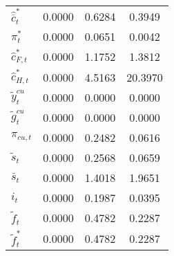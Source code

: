 \begin{center}
\begin{longtable}{lccc}
${\hat {\bar c}_t^*}  $	 & 	       0.0000	 & 	       0.6284	 & 	       0.3949 \\ 
${\pi_t^*}            $	 & 	       0.0000	 & 	       0.0651	 & 	       0.0042 \\ 
${\hat c_{F,t}^*}     $	 & 	       0.0000	 & 	       1.1752	 & 	       1.3812 \\ 
${\hat c_{H,t}^*}     $	 & 	       0.0000	 & 	       4.5163	 & 	      20.3970 \\ 
${\tilde y_t^{cu}}    $	 & 	       0.0000	 & 	       0.0000	 & 	       0.0000 \\ 
${\tilde g_t^{cu}}    $	 & 	       0.0000	 & 	       0.0000	 & 	       0.0000 \\ 
${\pi_{cu,t}}         $	 & 	       0.0000	 & 	       0.2482	 & 	       0.0616 \\ 
${\tilde s_t}         $	 & 	       0.0000	 & 	       0.2568	 & 	       0.0659 \\ 
${\bar s_t}           $	 & 	       0.0000	 & 	       1.4018	 & 	       1.9651 \\ 
${i_t}                $	 & 	       0.0000	 & 	       0.1987	 & 	       0.0395 \\ 
${\tilde f_t}         $	 & 	       0.0000	 & 	       0.4782	 & 	       0.2287 \\ 
${\tilde f_t^*}       $	 & 	       0.0000	 & 	       0.4782	 & 	       0.2287 \\ 
\end{longtable}
 \end{center}
